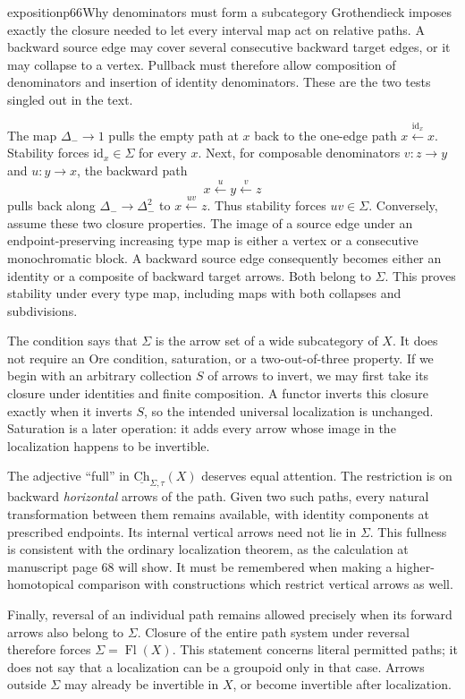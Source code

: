 \begin{dcomment}{exposition}{p66}{Why denominators must form a subcategory}
Grothendieck imposes exactly the closure needed to let every interval map act on relative paths. A backward source edge may cover several consecutive backward target edges, or it may collapse to a vertex. Pullback must therefore allow composition of denominators and insertion of identity denominators. These are the two tests singled out in the text.

The map $\Delta_-\to1$ pulls the empty path at $x$ back to the one-edge path $x\xleftarrow{\mathrm{id}_x}x$. Stability forces $\mathrm{id}_x\in\Sigma$ for every $x$. Next, for composable denominators $v:z\to y$ and $u:y\to x$, the backward path
\[
 x\xleftarrow{u}y\xleftarrow{v}z
\]
pulls back along $\Delta_-\to\Delta_-^2$ to
$x\xleftarrow{uv}z$. Thus stability forces $uv\in\Sigma$.
Conversely, assume these two closure properties. The image of a source edge under an endpoint-preserving increasing type map is either a vertex or a consecutive monochromatic block. A backward source edge consequently becomes either an identity or a composite of backward target arrows. Both belong to $\Sigma$. This proves stability under every type map, including maps with both collapses and subdivisions.

The condition says that $\Sigma$ is the arrow set of a wide subcategory of $X$. It does not require an Ore condition, saturation, or a two-out-of-three property. If we begin with an arbitrary collection $S$ of arrows to invert, we may first take its closure under identities and finite composition. A functor inverts this closure exactly when it inverts $S$, so the intended universal localization is unchanged. Saturation is a later operation: it adds every arrow whose image in the localization happens to be invertible.

The adjective ``full'' in $\underline{\mathrm{Ch}}_{\Sigma,\tau}(X)$ deserves equal attention. The restriction is on backward \emph{horizontal} arrows of the path. Given two such paths, every natural transformation between them remains available, with identity components at prescribed endpoints. Its internal vertical arrows need not lie in $\Sigma$. This fullness is consistent with the ordinary localization theorem, as the calculation at manuscript page 68 will show. It must be remembered when making a higher-homotopical comparison with constructions which restrict vertical arrows as well.

Finally, reversal of an individual path remains allowed precisely when its forward arrows also belong to $\Sigma$. Closure of the entire path system under reversal therefore forces $\Sigma=\operatorname{Fl}(X)$. This statement concerns literal permitted paths; it does not say that a localization can be a groupoid only in that case. Arrows outside $\Sigma$ may already be invertible in $X$, or become invertible after localization.
\end{dcomment}

